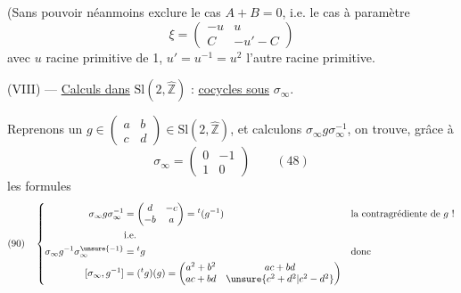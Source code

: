 
(Sans pouvoir néanmoins exclure le cas
$A+B=0$, 
i.e. le cas à  paramètre
\[
\xi=\begin{pmatrix}-u&u\\C&-u'-C\end{pmatrix}
\]
avec $u$ racine primitive  de 1,
$u'=u^{-1}=u^2$ l'autre racine primitive.


(VIII) --- \uline{Calculs dans} $\mathrm{Sl}(2,\widehat{\mathbb Z})$ : \uline{cocycles sous} $\sigma_\infty$.

Reprenons un $g\in\begin{pmatrix}a&b\\c&d\end{pmatrix}\in\mathrm{Sl}(2,\widehat{\mathbb Z})$,
et calculons $\sigma_\infty g\sigma_\infty^{-1}$, on trouve, grâce à
\[
\sigma_\infty=\begin{pmatrix}0&-1\\1&0\end{pmatrix}\qquad (48)
\]
les formules
\[
(90)\quad\left\{
\begin{aligned}
\sigma_\infty g\sigma_\infty^{-1}
&=\begin{pmatrix}d&-c\\-b&a\end{pmatrix}={}^t(g^{-1})
&&\text{la contragrédiente de $g$ !}\\
&\text{i.e.}\\
\sigma_\infty g^{-1}\sigma_\infty^{\unsure{-1}}
&={}^t g&&\text{donc}\\
[\sigma_\infty,g^{-1}]&=({}^t g)(g)
=\begin{pmatrix}a^2+b^2&ac+bd\\ac+bd&\unsure{c^2+d^2|c^2-d^2}\end{pmatrix}
\end{aligned}\right.
\]


